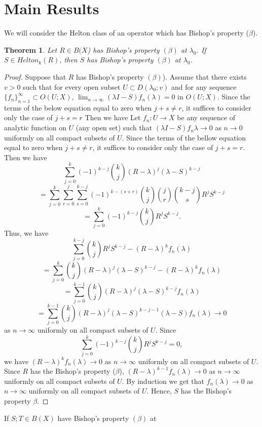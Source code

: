 \documentclass[12pt,a4paper]{amsart}
\newtheorem{theorem}{Theorem}[section]
\begin{document}
\section{Main Results}
We will consider the Helton class of an operator which has
Bishop's property ($\beta$).
\begin{theorem} Let $R\in B(X$) has Bishop's property $(\beta)$ at $\lambda_{0}$. If
$S\in Helton_{k}(R)$, then $S$ has Bishop's property $(\beta)$ at
$\lambda_{0}$.
\end{theorem}
\begin{proof} Suppose that $R$ has Bishop's property $(\beta)$). Assume that there
exists $v > 0$ such that for every open subset $U \subset
D(\lambda_{0}; v)$ and for any sequence $\{f_{n}\}^{\infty}_{ n=1}
\subset O(U;X)$, $\lim_{n\rightarrow \infty}(\lambda I-
S)f_{n}(\lambda) = 0$ in $O(U;X)$. Since the terms of the below
equation equal to zero when $j + s \not= r$, it suffices to
consider only the case of $j + s = r$ Then we have Let
$f_{n}:U\rightarrow X$ be any sequence of analytic function on $U$
(any open set) such that $(\lambda I- S)f_{n}\lambda\rightarrow 0$
as $n\rightarrow 0$ uniformly on all compact subsets of $U$. Since
the terms of the bellow equation equal to zero when $j+s\neq r$,
it suffices to consider only the case of $j+s=r$. Then we have
$$\sum^{k}_{j=0}(-1)^{k-j}\binom{k}{j}(R-\lambda)^{j}(\lambda-S)^{k-j}$$
$$=\sum^{k}_{j=0}\sum^{j}_{r=0}\sum^{k-j}_{s=0}(-1)^{k-(s+r)}\binom{k}{j}\binom{j}{r}\binom{k-j}{s}R^{j}S^{k-j}$$
$$=\sum^{k}_{j=0}(-1)^{k-j}\binom{k}{j}R^{j}S^{k-j}.$$
Thus, we have
$$\sum^{k-j}_{j=0}\binom{k}{j}R^{j}S^{k-j}-(R-\lambda)^{k}f_{n}(\lambda)$$
$$=\sum^{k}_{j=0}\binom{k}{j}(R-\lambda)^{j}(\lambda -S)^{k-j}-(R-\lambda)^{k}f_{n}(\lambda)$$
$$=\sum^{k-1}_{j=0}\binom{k}{j}(R-\lambda)^{j}(\lambda -S)^{k-j}f_{n}(\lambda)$$
$$=\sum^{k-1}_{j=0}\binom{k}{j}(R-\lambda)^{j}(\lambda -S)^{k-j-1}(\lambda-S)f_{n}(\lambda)\rightarrow 0$$
as $n\rightarrow\infty$ uniformly on all compact subsets of $U$.
Since
$$\sum^{k}_{j=0}(-1)^{k-j}\binom{k}{j}R^{j}S^{k-j}=0,$$
we have $(R-\lambda)^{k}f_{n}(\lambda)\rightarrow 0$ as
$n\rightarrow \infty$ uniformly on all compact subsets of $U$.
Since $R$ has the Bishop's property ($\beta$),
$(R-\lambda)^{k-1}f_{n}(\lambda)\rightarrow 0$ as $n\rightarrow
\infty$ uniformly on all compact subsets of $U$. By induction we
get that $f_{n}(\lambda)\rightarrow 0$ as $n\rightarrow \infty$
uniformly on all compact subsets of $U$. Hence, $S$ has the
Bishop's property $\beta$.
\end{proof}
If $S; T\in B(X)$ have Bishop's property $(\beta)$ at
\end{document}
